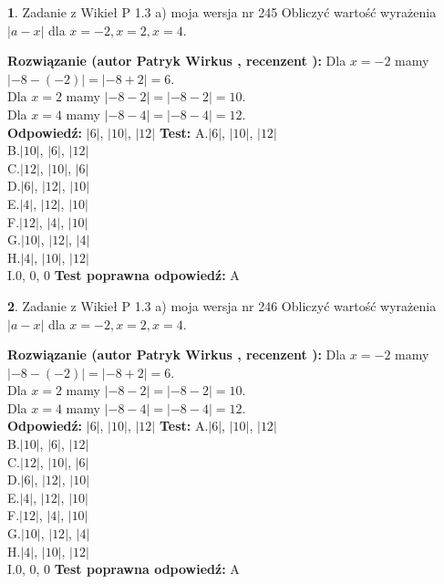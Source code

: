 \documentclass[12pt, a4paper]{article}
\theoremstyle{definition} %
\newtheorem{zad}{}
\newcommand{\zadStart}[1]{\begin{zad}#1\newline}
\newcommand{\zadStop}{\end{zad}}
\newcommand{\rozwStart}[2]{\noindent \textbf{Rozwiązanie (autor #1 , recenzent #2): }\newline}
\newcommand{\rozwStop}{\newline}
\newcommand{\odpStart}{\noindent \textbf{Odpowiedź:}\newline}
\newcommand{\odpStop}{\newline}
\newcommand{\testStart}{\noindent \textbf{Test:}\newline}
\newcommand{\testStop}{\newline}
\newcommand{\kluczStart}{\noindent \textbf{Test poprawna odpowiedź:}\newline}
\newcommand{\kluczStop}{\newline}
\begin{document}
\zadStart{Zadanie z Wikieł P 1.3 a) moja wersja nr 245}
Obliczyć wartość wyrażenia $|a - x|$ dla $x=-2,x=2,x=4$.
\zadStop
\rozwStart{Patryk Wirkus}{}
Dla $x = -2$ mamy $|-8 - (-2)| = |-8 + 2| = 6$.\\
Dla $x = 2$ mamy $|-8 - 2| = |-8 - 2| = 10$.\\
Dla $x = 4$ mamy $|-8 - 4| = |-8 - 4| = 12$.\\
\rozwStop
\odpStart
$|6|$, $|10|$, $|12|$
\odpStop
\testStart
A.$|6|$, $|10|$, $|12|$\\
B.$|10|$, $|6|$, $|12|$\\
C.$|12|$, $|10|$, $|6|$\\
D.$|6|$, $|12|$, $|10|$\\
E.$|4|$, $|12|$, $|10|$\\
F.$|12|$, $|4|$, $|10|$\\
G.$|10|$, $|12|$, $|4|$\\
H.$|4|$, $|10|$, $|12|$\\
I.$0$, $0$, $0$
\testStop
\kluczStart
A
\kluczStop



\zadStart{Zadanie z Wikieł P 1.3 a) moja wersja nr 246}
Obliczyć wartość wyrażenia $|a - x|$ dla $x=-2,x=2,x=4$.
\zadStop
\rozwStart{Patryk Wirkus}{}
Dla $x = -2$ mamy $|-8 - (-2)| = |-8 + 2| = 6$.\\
Dla $x = 2$ mamy $|-8 - 2| = |-8 - 2| = 10$.\\
Dla $x = 4$ mamy $|-8 - 4| = |-8 - 4| = 12$.\\
\rozwStop
\odpStart
$|6|$, $|10|$, $|12|$
\odpStop
\testStart
A.$|6|$, $|10|$, $|12|$\\
B.$|10|$, $|6|$, $|12|$\\
C.$|12|$, $|10|$, $|6|$\\
D.$|6|$, $|12|$, $|10|$\\
E.$|4|$, $|12|$, $|10|$\\
F.$|12|$, $|4|$, $|10|$\\
G.$|10|$, $|12|$, $|4|$\\
H.$|4|$, $|10|$, $|12|$\\
I.$0$, $0$, $0$
\testStop
\kluczStart
A
\kluczStop
\end{document}
